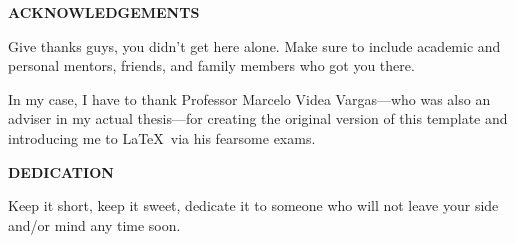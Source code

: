 \newpage
\begin{center}
	{\Large\bf{ACKNOWLEDGEMENTS}}
\end{center}
	\vfill	
	Give thanks guys, you didn't get here alone. Make sure to include academic and personal mentors, friends, and family members who got you there.
    
    In my case, I have to thank Professor Marcelo Videa Vargas---who was also an adviser in my actual thesis---for creating the original version of this template and introducing me to \LaTeX~via his fearsome exams.
	\vfill
    
\newpage
\begin{center}
	{\Large\bf{DEDICATION}}
    
	\vfill	
	Keep it short, keep it sweet, dedicate it to someone who will not leave your side and/or mind any time soon.
	\vfill
\end{center}

\newpage
\tableofcontents				   %
\cleardoublepage
{}
{} %
\listoftables					   %
\cleardoublepage
{}
{} %
\listoffigures					   %

\newpage
\setcounter{page}{1}			   %









\setcounter{originalpagenumber}{\number\value{page}} %


\setcounter{page}{\number\value{originalpagenumber}} %


